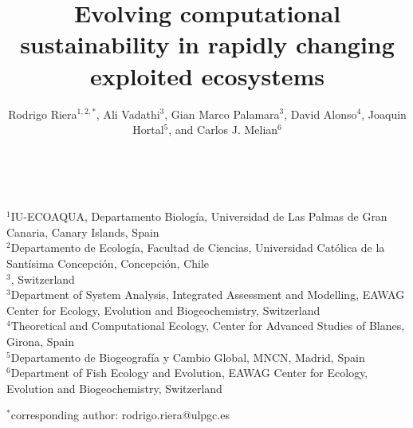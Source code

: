 \documentclass[12pt,a4paper]{article}
\begin{document}
\title{Evolving computational sustainability in rapidly changing exploited ecosystems}

\maketitle
\noindent \author{Rodrigo Riera$^{1,2,*}$, Ali Vadathi$^{3}$, Gian Marco Palamara${^3}$, David Alonso${^4}$, Joaqu\´in Hortal${^5}$, and Carlos J. Meli\´an${^6}$}
            \\
            
            \vspace{0.25 in}
            
  \noindent  $^{1}$IU-ECOAQUA, Departamento Biolog\'ia, Universidad de Las Palmas de Gran Canaria, Canary Islands, Spain\\
  $^{2}$Departamento de Ecolog\'ia, Facultad de Ciencias, Universidad Cat\'olica de la Sant\'isima Concepci\'on, Concepci\'on, Chile\\
  $^{3}$, Switzerland\\
  $^{3}$Department of System Analysis, Integrated Assessment and Modelling, EAWAG Center for Ecology, Evolution and Biogeochemistry, Switzerland\\
  $^{4}$Theoretical and Computational Ecology, Center for Advanced Studies of Blanes, Girona, Spain\\
  $^{5}$Departamento de Biogeograf\'ia y Cambio Global, MNCN, Madrid, Spain\\
  $^{6}$Department of Fish Ecology and Evolution, EAWAG Center for Ecology, Evolution and Biogeochemistry, Switzerland\\
\vspace{0.25 in}

  $^{*}$corresponding author: rodrigo.riera@ulpgc.es

\newpage
\end{document}
